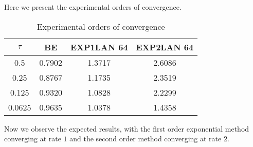 Here we present the experimental orders of convergence.
\begin{table}[H]
    \centering
    \begin{tabular}{| c | c | c | c |}
    \hline
    $\tau$ & BE & EXP1LAN 64 & EXP2LAN 64 \\
    \hline
    0.5 & 0.7902 & 1.3717 & 2.6086 \\
    0.25 & 0.8767 & 1.1735 & 2.3519 \\
    0.125 & 0.9320 & 1.0828 & 2.2299\\
    0.0625 & 0.9635  & 1.0378 & 1.4358 \\
    \hline
    \end{tabular}
    \caption{Experimental orders of convergence}
    \label{tab:reduced_data}
\end{table}

Now we observe the expected results, with the first order exponential method converging at rate $1$ and the second order method converging at rate $2$.